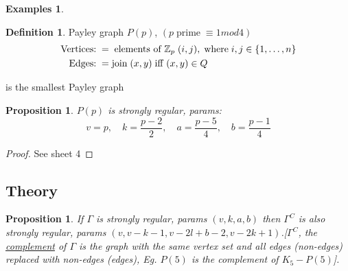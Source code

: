 \documentclass[]{article}
\newtheorem{prop}[thm]{Proposition}
\theoremstyle{definition}
\newtheorem*{defn}{Definition}
\newtheorem*{exmps}{Examples}
\theoremstyle{remark}
\numberwithin{equation}{section}
\begin{document}
\begin{exmps}
\begin{enumerate}
			\begin{defn} Payley graph $P(p)$, $(p\;\text{prime}\;\equiv 1 mod 4)$\\
			\begin{align*}
				\text{Vertices:}\; &=\;\text{elements of $\mathbb{Z}_p$}\; (i,j),\; \text{where}\; i,j \in \{1,\hdots,n\}\\
				\text{Edges:}\; &= \text{join}\; (x,y)\; \text{iff $(x,y) \in Q$}\\
			\end{align*}
			\begin{figure}[H]
				\centering
			\end{figure} is the smallest Payley graph
			\end{defn}
		\end{enumerate}
		\begin{prop} $P(p)$ is strongly regular, params:
		\[
		v =p, \quad k = \frac{p-2}{2}, \quad a=\frac{p-5}{4},\quad b=\frac{p-1}{4}
		\]
		\end{prop}
		\begin{proof} See sheet 4
		\end{proof}
	\end{exmps}
	\subsection{Theory}
		\begin{prop} If $\Gamma$ is strongly regular, params $(v,k,a,b)$ then $\Gamma^C$ is also strongly regular, params $(v,v-k-1, v-2l+b-2, v-2k+1)$.[$\Gamma^C$, the \underline{complement} of $\Gamma$ is the graph with the same vertex set and all edges (non-edges) replaced with non-edges (edges), Eg. $P(5)$ is the complement of $K_5 - P(5)$].
		\end{prop}
\end{document}
